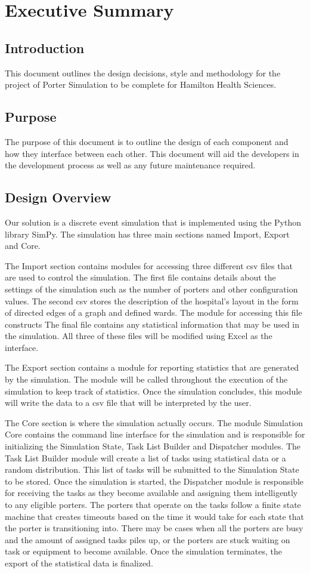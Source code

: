 \documentclass[paper=letter, fontsize=10pt]{scrartcl}
\numberwithin{equation}{section}		%
\numberwithin{figure}{section}			%
\numberwithin{table}{section}				%
\begin{document}
\section{Executive Summary}
\subsection{Introduction}
This document outlines the design decisions, style and methodology for the project of Porter Simulation to be complete for Hamilton Health Sciences.
\subsection{Purpose}
The purpose of this document is to outline the design of each component and how they interface between each other. This document will aid the developers in the development process as well as any future maintenance required.
\subsection{Design Overview}
Our solution is a discrete event simulation that is implemented using the Python library SimPy. The simulation has three main sections named Import, Export and Core. 

The Import section contains modules for accessing three different csv files that are used to control the simulation. The first file contains details about the settings of the simulation such as the number of porters and other configuration values. The second csv stores the description of the hospital's layout in the form of directed edges of a graph and defined wards. The module for accessing this file constructs  The final file contains any statistical information that may be used in the simulation. All three of these files will be modified using Excel as the interface.

The Export section contains a module for reporting statistics that are generated by the simulation. The module will be called throughout the execution of the simulation to keep track of statistics. Once the simulation concludes, this module will write the data to a csv file that will be interpreted by the user.

The Core section is where the simulation actually occurs. The module Simulation Core contains the command line interface for the simulation and is responsible for initializing the Simulation State, Task List Builder and Dispatcher modules. The Task List Builder module will create a list of tasks using statistical data or a random distribution. This list of tasks will be submitted to the Simulation State to be stored. Once the simulation is started, the Dispatcher module is responsible for receiving the tasks as they become available and assigning them intelligently to any eligible porters. The porters that operate on the tasks follow a finite state machine that creates timeouts based on the time it would take for each state that the porter is transitioning into. There may be cases when all the porters are busy and the amount of assigned tasks piles up, or the porters are stuck waiting on task or equipment to become available. Once the simulation terminates, the export of the statistical data is finalized.
\end{document}
